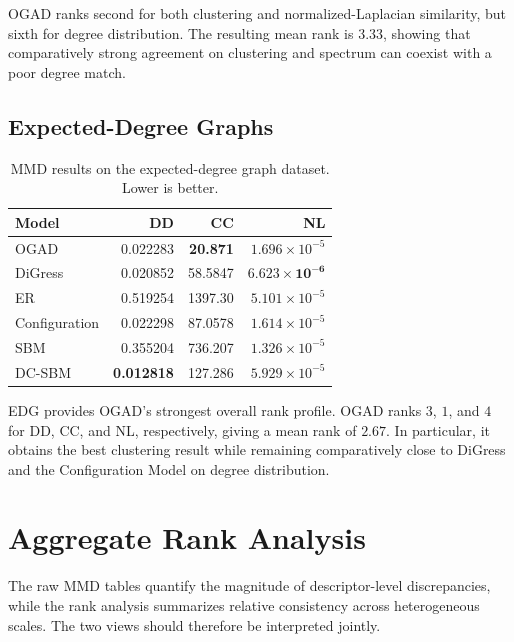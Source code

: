 OGAD ranks second for both clustering and normalized-Laplacian similarity, but sixth for degree distribution. The resulting mean rank is \(3.33\), showing that comparatively strong agreement on clustering and spectrum can coexist with a poor degree match.


\subsection{Expected-Degree Graphs}
\label{subsec:exp_edg}

\begin{table}[htbp]
    \centering
    \caption{MMD results on the expected-degree graph dataset. Lower is better.}
    \label{tab:exp_edg}
    \begin{tabular}{lrrr}
        \hline
        Model & DD & CC & NL \\
        \hline
        OGAD          & 0.022283 & \textbf{20.871} & \(1.696\times10^{-5}\) \\
        DiGress       & 0.020852 & 58.5847 & \(\mathbf{6.623\times10^{-6}}\) \\
        ER            & 0.519254 & 1397.30 & \(5.101\times10^{-5}\) \\
        Configuration & 0.022298 & 87.0578 & \(1.614\times10^{-5}\) \\
        SBM           & 0.355204 & 736.207 & \(1.326\times10^{-5}\) \\
        DC-SBM        & \textbf{0.012818} & 127.286 & \(5.929\times10^{-5}\) \\
        \hline
    \end{tabular}
\end{table}

EDG provides OGAD's strongest overall rank profile. OGAD ranks \(3\), \(1\), and \(4\) for DD, CC, and NL, respectively, giving a mean rank of \(2.67\). In particular, it obtains the best clustering result while remaining comparatively close to DiGress and the Configuration Model on degree distribution.


\section{Aggregate Rank Analysis}
\label{sec:exp_rank_analysis}

The raw MMD tables quantify the magnitude of descriptor-level discrepancies, while the rank analysis summarizes relative consistency across heterogeneous scales. The two views should therefore be interpreted jointly.


